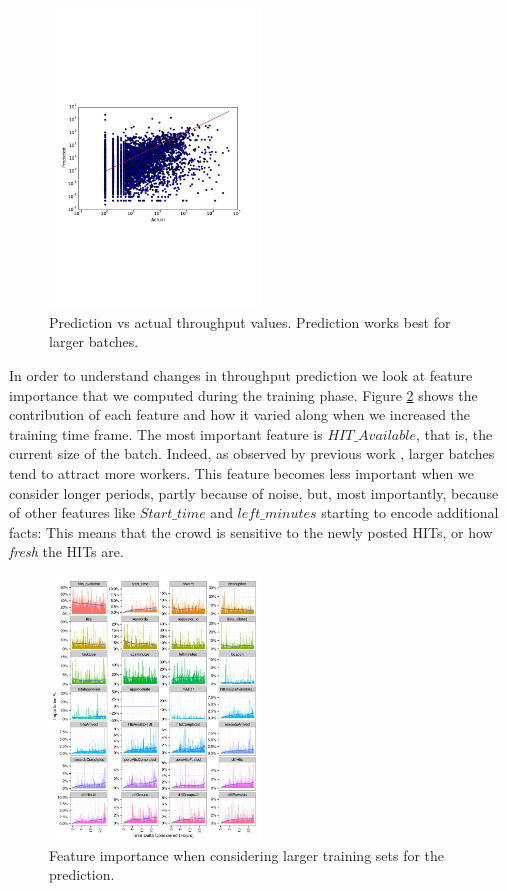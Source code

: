 \begin{figure}[tb]
	\centering
		\includegraphics[width=0.5\textwidth]{figures/predictions_3}
	\caption{Prediction vs actual throughput values. Prediction works best for larger batches.}
	\label{fig:pred}
\end{figure}

In order to understand  changes in throughput prediction we  look at  feature importance that we computed during   the training phase. Figure \ref{fig:importances} shows the  contribution of each feature and how it varied along when we increased the training time frame.
The most important feature is $HIT\_Available$, that is, the current size of the batch. Indeed, as observed by previous work , larger batches tend to attract more workers. This feature becomes less important when we consider longer periods, partly because of  noise, but, most importantly, because of other features like $Start\_time$ and $left\_minutes$ starting to encode additional facts: This means that the crowd is sensitive to the newly posted HITs, or how \emph{fresh} the HITs are.

\begin{figure}[tb]
	\centering
		\includegraphics[width=0.5\textwidth]{figures/importances}
	\caption{Feature importance when considering larger training sets for the prediction.}
	\label{fig:importances}
\end{figure}
